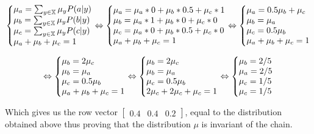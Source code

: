 \documentclass{article}
\begin{document}
\begin{equation}
    \left\{\begin{array}{@{}l@{}}
        \mu_{a} = \sum_{y \in \mathbb{X}} \mu_{y}P(a | y)\\
        \mu_{b} = \sum_{y \in \mathbb{X}} \mu_{y}P(b | y)\\
        \mu_{c} = \sum_{y \in \mathbb{X}} \mu_{y}P(c | y)\\
        \mu_{a} + \mu_{b} + \mu_{c} = 1\\
    \end{array}\right.\notag
    \Leftrightarrow
    \left\{\begin{array}{@{}l@{}}
        \mu_{a} = \mu_{a} * 0 + \mu_{b} * 0.5 + \mu_{c} * 1\\
        \mu_{b} = \mu_{a} * 1 + \mu_{b} * 0 + \mu_{c} * 0\\
        \mu_{c} = \mu_{a} * 0 + \mu_{b} * 0.5 + \mu_{c} * 0\\
        \mu_{a} + \mu_{b} + \mu_{c} = 1\\
    \end{array}\right.
    \Leftrightarrow
    \left\{\begin{array}{@{}l@{}}
        \mu_{a} = 0.5\mu_{b} + \mu_{c}\\
        \mu_{b} = \mu_{a}\\
        \mu_{c} = 0.5\mu_{b}\\
        \mu_{a} + \mu_{b} + \mu_{c} = 1\\
    \end{array}\right.
\end{equation}

\begin{equation}
    \Leftrightarrow
    \left\{\begin{array}{@{}l@{}}
        \mu_{b} = 2\mu_{c}\\
        \mu_{b} = \mu_{a}\\
        \mu_{c} = 0.5\mu_{b}\\
        \mu_{a} + \mu_{b} + \mu_{c} = 1\\
    \end{array}\right.\notag
    \Leftrightarrow
    \left\{\begin{array}{@{}l@{}}
        \mu_{b} = 2\mu_{c}\\
        \mu_{b} = \mu_{a}\\
        \mu_{c} = 0.5\mu_{b}\\
        2\mu_{c} + 2\mu_{c} + \mu_{c} = 1\\
    \end{array}\right.
    \Leftrightarrow
    \left\{\begin{array}{@{}l@{}}
        \mu_{b} = 2/5\\
        \mu_{a} = 2/5\\
        \mu_{c} = 1/5\\
        \mu_{c} = 1/5\\
    \end{array}\right.
\end{equation}

\bigskip

Which gives us the row vector $\begin{bmatrix} 0.4 & 0.4 & 0.2 \end{bmatrix}$, equal to the distribution obtained above thus proving that the distribution $\mu$ is invariant of the chain.
\end{document}
